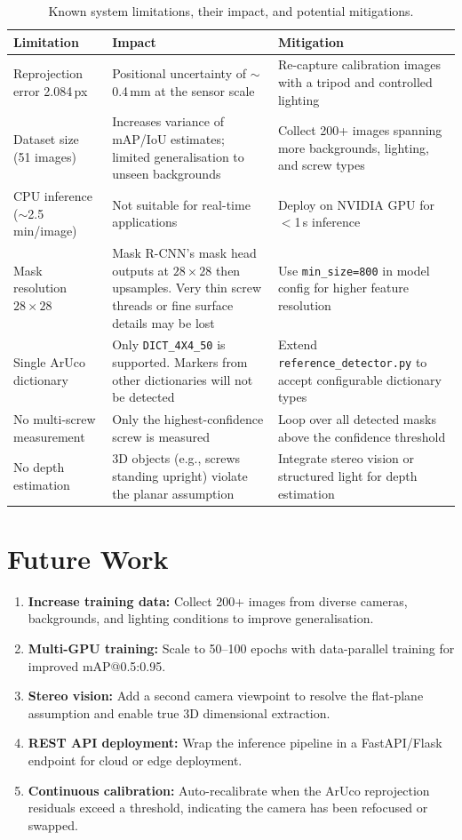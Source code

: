\documentclass[12pt, a4paper, twoside]{report}
\begin{document}
\begin{table}[H]
\centering
\caption{Known system limitations, their impact, and potential mitigations.}
\label{tab:limitations}
\begin{tabular}{p{4cm}p{4.5cm}p{5cm}}
\toprule
\textbf{Limitation} & \textbf{Impact} & \textbf{Mitigation} \\
\midrule
Reprojection error 2.084\,px & Positional uncertainty of $\sim$0.4\,mm at the sensor scale & Re-capture calibration images with a tripod and controlled lighting \\
\midrule
Dataset size (51 images) & Increases variance of mAP/IoU estimates; limited generalisation to unseen backgrounds & Collect 200+ images spanning more backgrounds, lighting, and screw types \\
\midrule
CPU inference ($\sim$2.5 min/image) & Not suitable for real-time applications & Deploy on NVIDIA GPU for $<$1\,s inference \\
\midrule
Mask resolution $28 \times 28$ & Mask R-CNN's mask head outputs at $28 \times 28$ then upsamples. Very thin screw threads or fine surface details may be lost & Use \texttt{min\_size=800} in model config for higher feature resolution \\
\midrule
Single ArUco dictionary & Only \texttt{DICT\_4X4\_50} is supported. Markers from other dictionaries will not be detected & Extend \texttt{reference\_detector.py} to accept configurable dictionary types \\
\midrule
No multi-screw measurement & Only the highest-confidence screw is measured & Loop over all detected masks above the confidence threshold \\
\midrule
No depth estimation & 3D objects (e.g., screws standing upright) violate the planar assumption & Integrate stereo vision or structured light for depth estimation \\
\bottomrule
\end{tabular}
\end{table}

\section{Future Work}
\begin{enumerate}
    \item \textbf{Increase training data:} Collect 200+ images from diverse cameras, backgrounds, and lighting conditions to improve generalisation.
    \item \textbf{Multi-GPU training:} Scale to 50--100 epochs with data-parallel training for improved mAP@0.5:0.95.
    \item \textbf{Stereo vision:} Add a second camera viewpoint to resolve the flat-plane assumption and enable true 3D dimensional extraction.
    \item \textbf{REST API deployment:} Wrap the inference pipeline in a FastAPI/Flask endpoint for cloud or edge deployment.
    \item \textbf{Continuous calibration:} Auto-recalibrate when the ArUco reprojection residuals exceed a threshold, indicating the camera has been refocused or swapped.
\end{enumerate}
\end{document}
